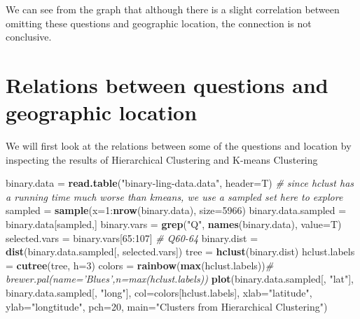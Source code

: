 \documentclass[]{article}
\newenvironment{Shaded}{\begin{snugshade}}{\end{snugshade}}
\newcommand{\KeywordTok}[1]{\textcolor[rgb]{0.13,0.29,0.53}{\textbf{{#1}}}}
\newcommand{\DataTypeTok}[1]{\textcolor[rgb]{0.13,0.29,0.53}{{#1}}}
\newcommand{\DecValTok}[1]{\textcolor[rgb]{0.00,0.00,0.81}{{#1}}}
\newcommand{\StringTok}[1]{\textcolor[rgb]{0.31,0.60,0.02}{{#1}}}
\newcommand{\CommentTok}[1]{\textcolor[rgb]{0.56,0.35,0.01}{\textit{{#1}}}}
\newcommand{\NormalTok}[1]{{#1}}
\begin{document}
We can see from the graph that although there is a slight correlation
between omitting these questions and geographic location, the connection
is not conclusive.

\section{Relations between questions and geographic
location}\label{relations-between-questions-and-geographic-location}

We will first look at the relations between some of the questions and
location by inspecting the results of Hierarchical Clustering and
K-means Clustering

\begin{Shaded}
\begin{Highlighting}[]
\NormalTok{binary.data =}\StringTok{ }\KeywordTok{read.table}\NormalTok{(}\StringTok{"binary-ling-data.data"}\NormalTok{, }\DataTypeTok{header=}\NormalTok{T)}
\CommentTok{# since hclust has a running time much worse than kmeans, we use a sampled set here to explore}
\NormalTok{sampled =}\StringTok{ }\KeywordTok{sample}\NormalTok{(}\DataTypeTok{x=}\DecValTok{1}\NormalTok{:}\KeywordTok{nrow}\NormalTok{(binary.data), }\DataTypeTok{size=}\DecValTok{5966}\NormalTok{)}
\NormalTok{binary.data.sampled =}\StringTok{ }\NormalTok{binary.data[sampled,]}
\NormalTok{binary.vars =}\StringTok{ }\KeywordTok{grep}\NormalTok{(}\StringTok{"Q"}\NormalTok{, }\KeywordTok{names}\NormalTok{(binary.data), }\DataTypeTok{value=}\NormalTok{T)}
\NormalTok{selected.vars =}\StringTok{ }\NormalTok{binary.vars[}\DecValTok{65}\NormalTok{:}\DecValTok{107}\NormalTok{] }\CommentTok{# Q60-64}
\NormalTok{binary.dist =}\StringTok{ }\KeywordTok{dist}\NormalTok{(binary.data.sampled[, selected.vars])}
\NormalTok{tree =}\StringTok{ }\KeywordTok{hclust}\NormalTok{(binary.dist)}
\NormalTok{hclust.labels =}\StringTok{ }\KeywordTok{cutree}\NormalTok{(tree, }\DataTypeTok{h=}\DecValTok{3}\NormalTok{)}
\NormalTok{colors =}\StringTok{ }\KeywordTok{rainbow}\NormalTok{(}\KeywordTok{max}\NormalTok{(hclust.labels))}\CommentTok{# brewer.pal(name='Blues',n=max(hclust.labels))}
\KeywordTok{plot}\NormalTok{(binary.data.sampled[, }\StringTok{"lat"}\NormalTok{], binary.data.sampled[, }\StringTok{"long"}\NormalTok{], }\DataTypeTok{col=}\NormalTok{colors[hclust.labels], }\DataTypeTok{xlab=}\StringTok{"latitude"}\NormalTok{, }\DataTypeTok{ylab=}\StringTok{"longtitude"}\NormalTok{, }\DataTypeTok{pch=}\DecValTok{20}\NormalTok{, }\DataTypeTok{main=}\StringTok{"Clusters from Hierarchical Clustering"}\NormalTok{)}
\end{Highlighting}
\end{Shaded}
\end{document}
